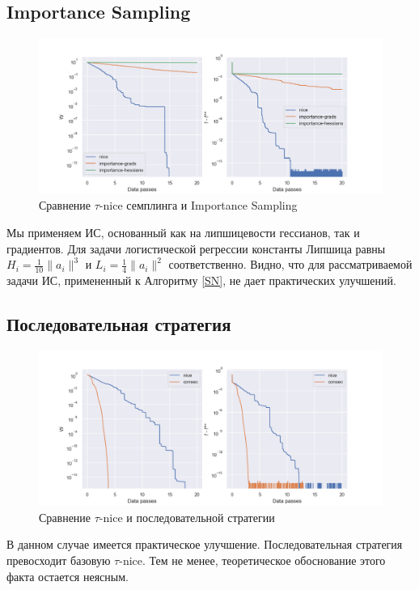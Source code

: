 \documentclass{article}
\theoremstyle{definition}
\theoremstyle{assumption}
\theoremstyle{lemma}
\theoremstyle{theorem}
\theoremstyle{proposition}
\begin{document}
	\subsection{Importance Sampling}
	\begin{figure}[h!]\label{fig:2}
		\centering
		\includegraphics[width=\textwidth]{importance sampling}
		\caption{Сравнение $\tau$-nice семплинга и Importance Sampling}
	\end{figure}
	Мы применяем ИС, основанный как на липшицевости гессианов, так и градиентов. Для задачи логистической регрессии константы Липшица равны $H_i = \frac{1}{10} \|a_i\|^3$ и $L_i = \frac{1}{4}\|a_i\|^2$ соответственно. Видно, что для рассматриваемой задачи ИС, примененный к Алгоритму \ref{SN}, не дает практических улучшений.
	
	\subsection{Последовательная стратегия}
	\begin{figure}[h!]\label{fig:3}
		\centering
		\includegraphics[width=\textwidth]{consecutive strategy 10}
		\caption{Сравнение $\tau$-nice и последовательной стратегии}
	\end{figure}
	В данном случае имеется практическое улучшение. Последовательная стратегия превосходит базовую $\tau$-nice. Тем не менее, теоретическое обоснование этого факта остается неясным.
	
\end{document}
